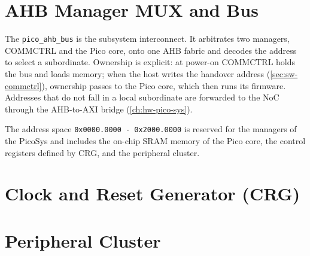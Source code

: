 \section{AHB Manager MUX and Bus}\label{sec:sw-ahb-bus}
The \texttt{pico\_ahb\_bus} is the subsystem interconnect. It arbitrates two managers, COMMCTRL and the Pico core, onto one AHB fabric and decodes the address to select a subordinate. Ownership is
explicit: at power-on COMMCTRL holds the bus and loads memory; when the host writes the handover address (\autoref{sec:sw-commctrl}), ownership passes to the Pico core, which then runs its firmware. Addresses that do not fall in a local subordinate are forwarded to the NoC through the AHB-to-AXI bridge (\autoref{ch:hw-pico-sys}). 

The address space \texttt{0x0000.0000 - 0x2000.0000} is reserved for the managers of the PicoSys and includes the on-chip SRAM memory of the Pico core, the control registers defined by CRG, and the peripheral cluster.   

\section{Clock and Reset Generator (CRG)}\label{sec:sw-crg}

\section{Peripheral Cluster}\label{sec:sw-peripheral-cluster}